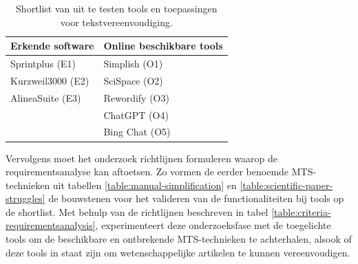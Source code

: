 \begin{center}
	\begin{table}[H]
		\begin{tabular}{ | m{6cm} | m{6cm} | } 
			\hline
			\textbf{Erkende software} & \textbf{Online beschikbare tools} \\
			\hline
			Sprintplus (E1) & Simplish (O1) \\
			Kurzweil3000 (E2) & SciSpace (O2) \\ 
			AlineaSuite (E3) & Rewordify (O3) \\
			& ChatGPT (O4) \\
			& Bing Chat (O5) \\
			\hline
		\end{tabular}
		\caption{Shortlist van uit te testen tools en toepassingen voor tekstvereenvoudiging.}
		\label{table:shortlist-tools}	
	\end{table}
\end{center}

Vervolgens moet het onderzoek richtlijnen formuleren waarop de requirementsanalyse kan aftoetsen. Zo vormen de eerder benoemde MTS-technieken uit tabellen \ref{table:manual-simplification} en \ref{table:scientific-paper-struggles} de bouwstenen voor het valideren van de functionaliteiten bij tools op de shortlist. Met behulp van de richtlijnen beschreven in tabel \ref{table:criteria-requirementsanalysis}, experimenteert deze onderzoeksfase met de toegelichte tools om de beschikbare en ontbrekende MTS-technieken te achterhalen, alsook of deze tools in staat zijn om wetenschappelijke artikelen te kunnen vereenvoudigen.


